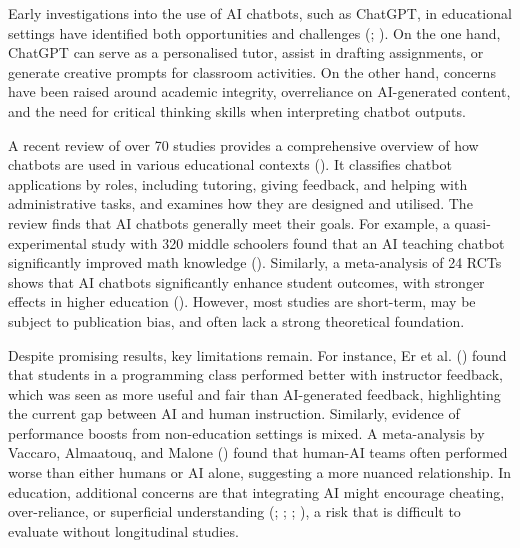 \documentclass[
  11pt,
]{article}
\begin{document}
Early investigations into the use of AI chatbots, such as ChatGPT, in educational settings have identified both opportunities and challenges (; ). On the one hand, ChatGPT can serve as a personalised tutor, assist in drafting assignments, or generate creative prompts for classroom activities. On the other hand, concerns have been raised around academic integrity, overreliance on AI-generated content, and the need for critical thinking skills when interpreting chatbot outputs.

A recent review of over 70 studies provides a comprehensive overview of how chatbots are used in various educational contexts (). It classifies chatbot applications by roles, including tutoring, giving feedback, and helping with administrative tasks, and examines how they are designed and utilised. The review finds that AI chatbots generally meet their goals. For example, a quasi-experimental study with 320 middle schoolers found that an AI teaching chatbot significantly improved math knowledge (). Similarly, a meta-analysis of 24 RCTs shows that AI chatbots significantly enhance student outcomes, with stronger effects in higher education (). However, most studies are short-term, may be subject to publication bias, and often lack a strong theoretical foundation.

Despite promising results, key limitations remain. For instance, Er et al. () found that students in a programming class performed better with instructor feedback, which was seen as more useful and fair than AI-generated feedback, highlighting the current gap between AI and human instruction. Similarly, evidence of performance boosts from non-education settings is mixed. A meta-analysis by Vaccaro, Almaatouq, and Malone () found that human-AI teams often performed worse than either humans or AI alone, suggesting a more nuanced relationship. In education, additional concerns are that integrating AI might encourage cheating, over-reliance, or superficial understanding (; ; ; ), a risk that is difficult to evaluate without longitudinal studies.
\end{document}
